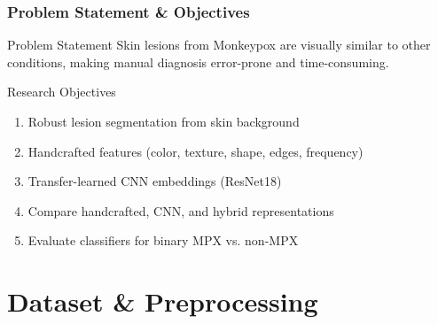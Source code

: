 \documentclass[aspectratio=169,professionalfonts]{beamer}
\begin{document}
\begin{frame}
    \frametitle{Problem Statement \& Objectives}
    \footnotesize
    
    \begin{block}{\footnotesize Problem Statement}
        \footnotesize
        Skin lesions from Monkeypox are visually similar to other conditions, making manual diagnosis error-prone and time-consuming.
    \end{block}
    
    \vspace{0.3em}
    
    \begin{exampleblock}{\footnotesize Research Objectives}
        \footnotesize
        \begin{enumerate}
            \setlength{\itemsep}{1pt}
            \item Robust lesion segmentation from skin background
            \item Handcrafted features (color, texture, shape, edges, frequency)
            \item Transfer-learned CNN embeddings (ResNet18)
            \item Compare handcrafted, CNN, and hybrid representations
            \item Evaluate classifiers for binary MPX vs. non-MPX
        \end{enumerate}
    \end{exampleblock}
\end{frame}

\section{Dataset \& Preprocessing}
\end{document}
